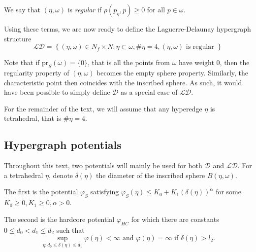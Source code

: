 \documentclass[12pt,a4paper]{report}
\begin{document}

We say that $(\eta,\omega)$ is \textit{regular} if $\rho(p_\eta,p)\geq 0 $ for all $p \in \omega$.

Using these terms, we are now ready to define the Laguerre-Delaunay hypergraph structure
$$\mathcal {LD} = \left\{ (\eta,\omega) \in N_f \times N: \eta \subset \omega, \# \eta = 4, (\eta,\omega) \text{ is regular } \right\}$$


Note that if $\text{pr}_S (\omega) = \{0\}$, that is all the points from $\omega$ have weight 0, then the regularity property of $(\eta, \omega)$ becomes the empty sphere property. Similarly, the characteristic point then coincides with the inscribed sphere. As such, it would have been possible to simply define $\mathcal D$ as a special case of $\mathcal {LD}$.

For the remainder of the text, we will assume that any hyperedge $\eta$ is tetrahedral, that is $\#\eta = 4$.

\subsection{Hypergraph potentials}
Throughout this text, two potentials will mainly be used for both $\mathcal D$ and $\mathcal {LD}$. For a tetrahedral $\eta$, denote $\delta(\eta)$ the diameter of the inscribed sphere $B(\eta,\omega)$.

The first is the potential $\varphi_S$ satisfying $\varphi_S(\eta) \leq K_0 + K_1(\delta(\eta))^\alpha$ for some $K_0 \geq 0, K_1 \geq 0, \alpha > 0$.

The second is the hardcore potential $\varphi_{HC}$ for which there are constants $0\leq d_0 < d_1 \leq d_2$  such that
$$\sup_{\eta: d_0 \leq \delta(\eta) \leq d_1} \varphi(\eta) < \infty \text{ and } \varphi(\eta)=\infty \text{ if } \delta(\eta)>l_2 .$$ 
\end{document}
